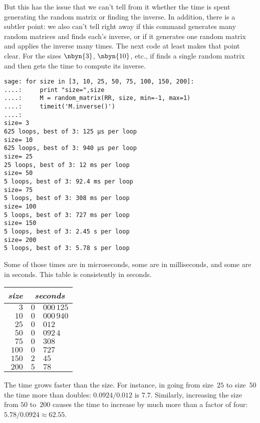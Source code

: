 But this has the issue that we can't tell from it  
whether the time is spent generating
the random matrix or finding the inverse.
In addition, there is a subtler point: we also can't tell right away if
this command generates many random matrices and finds 
each's inverse,
or if it generates one random matrix and applies the inverse many times.
The next code at least makes that point clear.
For the sizes $\nbyn{3}$, $\nbyn{10}$, etc.,
if finds a single random matrix and then 
gets the time to compute its inverse.
\begin{lstlisting}
sage: for size in [3, 10, 25, 50, 75, 100, 150, 200]:
....:     print "size=",size
....:     M = random_matrix(RR, size, min=-1, max=1)
....:     timeit('M.inverse()')
....: 
size= 3
625 loops, best of 3: 125 µs per loop
size= 10
625 loops, best of 3: 940 µs per loop
size= 25
25 loops, best of 3: 12 ms per loop
size= 50
5 loops, best of 3: 92.4 ms per loop
size= 75
5 loops, best of 3: 308 ms per loop
size= 100
5 loops, best of 3: 727 ms per loop
size= 150
5 loops, best of 3: 2.45 s per loop
size= 200
5 loops, best of 3: 5.78 s per loop
\end{lstlisting}
Some of those times are in microseconds, some are in milliseconds, and some
are in seconds.
This table is consistently in seconds.
\begin{center}
  \begin{tabular}{r|r@{.}l}
    \textit{size}     &\multicolumn{2}{c}{\textit{seconds}}  \\  \hline
    $3$      &$0$ &$000\,125$ \\
    $10$     &$0$ &$000\,940$ \\
    $25$     &$0$ &$012$ \\
    $50$     &$0$ &$092\,4$ \\
    $75$     &$0$ &$308$ \\
    $100$    &$0$ &$727$ \\
    $150$    &$2$ &$45$ \\
    $200$    &$5$ &$78$ 
  \end{tabular}
\end{center}
The time grows faster than the size.
For instance, in going from size~$25$ to size~$50$ the time more than
doubles: $0.0924/0.012$ is $7.7$.
Similarly, increasing the size from $50$ to~$200$ causes the time to 
increase by much more than a factor of four: $5.78/0.0924\approx 62.55$. 

